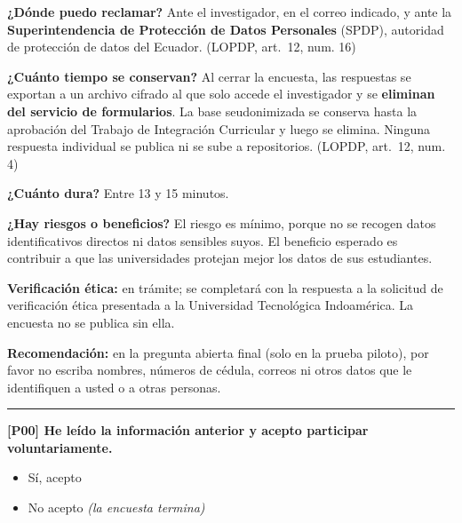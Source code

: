 \documentclass[11pt,a4paper]{article}
\begin{document}
\textbf{¿Dónde puedo reclamar?} Ante el investigador, en el correo indicado, y ante la \textbf{Superintendencia de Protección de Datos Personales} (SPDP), autoridad de protección de datos del Ecuador. {\footnotesize\color{gray}(LOPDP, art.~12, num. 16)}

\textbf{¿Cuánto tiempo se conservan?} Al cerrar la encuesta, las respuestas se exportan a un archivo cifrado al que solo accede el investigador y se \textbf{eliminan del servicio de formularios}. La base seudonimizada se conserva hasta la aprobación del Trabajo de Integración Curricular y luego se elimina. Ninguna respuesta individual se publica ni se sube a repositorios. {\footnotesize\color{gray}(LOPDP, art.~12, num. 4)}

\textbf{¿Cuánto dura?} Entre 13 y 15 minutos.

\textbf{¿Hay riesgos o beneficios?} El riesgo es mínimo, porque no se recogen datos identificativos directos ni datos sensibles suyos. El beneficio esperado es contribuir a que las universidades protejan mejor los datos de sus estudiantes.

\textbf{Verificación ética:} en trámite; se completará con la respuesta a la solicitud de verificación ética presentada a la Universidad Tecnológica Indoamérica. La encuesta no se publica sin ella.

\textbf{Recomendación:} en la pregunta abierta final (solo en la prueba piloto), por favor no escriba nombres, números de cédula, correos ni otros datos que le identifiquen a usted o a otras personas.

\medskip\noindent\rule{\textwidth}{0.4pt}\medskip

\textbf{[P00] He leído la información anterior y acepto participar voluntariamente.}
\begin{itemize}
  \item Sí, acepto
  \item No acepto \textit{(la encuesta termina)}
\end{itemize}
\end{document}
